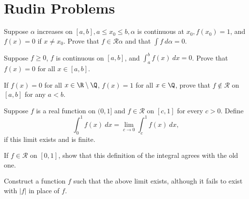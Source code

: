 \documentclass{assignment}
\begin{document}
\maketitle
\section*{Rudin Problems}
\begin{question}[6.1]
 Suppose $\alpha$ increases on $[a,b], a \leq x_0 \leq b, \alpha$ is continuous at $x_0, f(x_0) =
1$, and $f(x) = 0 $ if $x \neq x_0$. Prove that $f\in\mathcal{R}{\alpha}$ and that $\int f\ d\alpha
= 0$. 
\end{question}

\begin{question}[6.2]
 Suppose $f \geq 0$, $f$ is continuous on $[a,b]$, and $\int_a^b f(x)\ dx = 0$. Prove that $f(x) =
0$ for all $x\in[a,b]$. 
\end{question}

\begin{question}[6.4]
 If $f(x) = 0$ for all $x\in\R\setminus\Q$, $f(x) = 1$ for all $x\in\Q$, prove that $f \notin
\mathcal{R}$ on $[a,b]$ for any $a < b$.
\end{question}

\begin{question}[6.7]
 Suppose $f$ is a real function on $(0,1]$ and $f\in\mathcal{R}$ on $[c, 1]$ for every $c > 0$.
Define $$\int_0^1 f(x)\ dx = \lim_{c\to 0}\int_c^1 f(x)\ dx,$$ if this limit exists and is finite.
\begin{qparts}
  \item If $f\in\mathcal{R}$ on $[0,1]$, show that this definition of the integral agrees with the
old one.
  \item Construct a function $f$ such that the above limit exists, although it fails to exist with
$|f|$ in place of $f$.
\end{qparts} 
\end{question}

\begin{question}[6.8]
  
\end{question}
\end{document}
